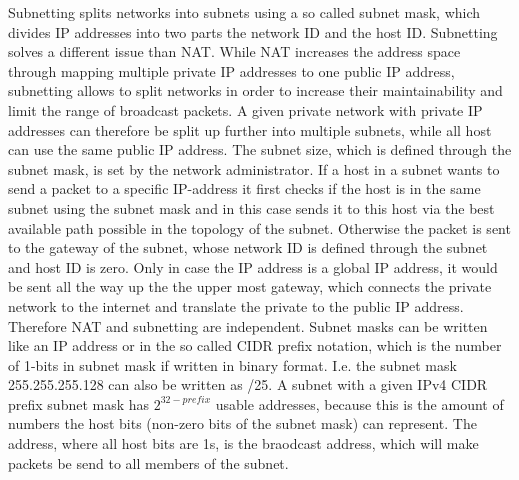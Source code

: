 Subnetting splits networks into subnets using a so called subnet mask, which divides IP addresses into two parts \textendash{} the network ID and the host ID. Subnetting solves a different issue than \ac{NAT}. While \ac{NAT} increases the address space through mapping multiple private IP addresses to one public IP address, subnetting allows to split networks in order to increase their maintainability and limit the range of broadcast packets. A given private network with private IP addresses can therefore be split up further into multiple subnets, while all host can use the same public IP address. The subnet size, which is defined through the subnet mask, is set by the network administrator. If a host in a subnet wants to send a packet to a specific IP-address it first checks if the host is in the same subnet using the subnet mask and in this case sends it to this host via the best available path possible in the topology of the subnet. Otherwise the packet is sent to the gateway of the subnet, whose network ID is defined through the subnet and host ID is zero. Only in case the IP address is a global IP address, it would be sent all the way up the the upper most gateway, which connects the private network to the internet and translate the private to the public IP address. Therefore \ac{NAT} and subnetting are independent. Subnet masks can be written like an IP address or in the so called CIDR prefix notation, which is the number of 1-bits in subnet mask if written in binary format. I.e. the subnet mask 255.255.255.128 can also be written as /25. A subnet with a given IPv4 CIDR prefix subnet mask has $2^{32 - prefix}$ usable addresses, because this is the amount of numbers the host bits (non-zero bits of the subnet mask) can represent. The address, where all host bits are 1s, is the braodcast address, which will make packets be send to all members of the subnet.
